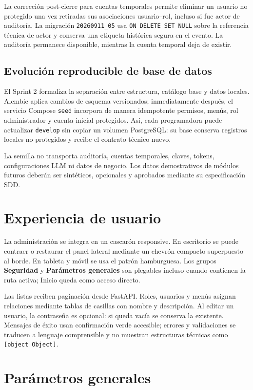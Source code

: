 \documentclass[11pt,letterpaper]{article}
\newcommand{\file}[1]{\texttt{#1}}
\begin{document}
La corrección post-cierre para cuentas temporales permite eliminar un usuario no protegido una vez retiradas sus asociaciones usuario--rol, incluso si fue actor de auditoría. La migración \file{20260911\_05} usa \file{ON DELETE SET NULL} sobre la referencia técnica de actor y conserva una etiqueta histórica segura en el evento. La auditoría permanece disponible, mientras la cuenta temporal deja de existir.

\subsection{Evolución reproducible de base de datos}

El Sprint 2 formaliza la separación entre estructura, catálogo base y datos locales. Alembic aplica cambios de esquema versionados; inmediatamente después, el servicio Compose \file{seed} incorpora de manera idempotente permisos, menús, rol administrador y cuenta inicial protegidos. Así, cada programadora puede actualizar \file{develop} sin copiar un volumen PostgreSQL: su base conserva registros locales no protegidos y recibe el contrato técnico nuevo.

La semilla no transporta auditoría, cuentas temporales, claves, tokens, configuraciones LLM ni datos de negocio. Los datos demostrativos de módulos futuros deberán ser sintéticos, opcionales y aprobados mediante su especificación SDD.

\section{Experiencia de usuario}

La administración se integra en un cascarón responsive. En escritorio se puede contraer o restaurar el panel lateral mediante un chevrón compacto superpuesto al borde. En tableta y móvil se usa el patrón hamburguesa. Los grupos \textbf{Seguridad} y \textbf{Parámetros generales} son plegables incluso cuando contienen la ruta activa; Inicio queda como acceso directo.

Las listas reciben paginación desde FastAPI. Roles, usuarios y menús asignan relaciones mediante tablas de casillas con nombre y descripción. Al editar un usuario, la contraseña es opcional: si queda vacía se conserva la existente. Mensajes de éxito usan confirmación verde accesible; errores y validaciones se traducen a lenguaje comprensible y no muestran estructuras técnicas como \file{[object Object]}.

\section{Parámetros generales}
\end{document}
